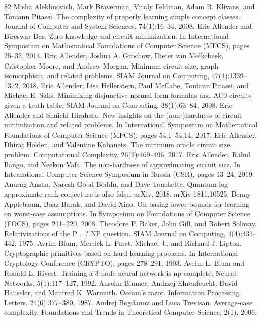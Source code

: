 \documentclass[10pt,a4paper]{article}
\begin{document}
\begin{thebibliography}{82}
Misha Alekhnovich, Mark Braverman, Vitaly Feldman, Adam R. Klivans, and Toniann Pitassi. The complexity of properly learning simple concept classes. Journal of Computer and System Sciences, 74(1):16–34, 2008.
Eric Allender and Bireswar Das. Zero knowledge and circuit minimization. In International Symposium on Mathematical Foundations of Computer Science (MFCS), pages 25–32, 2014.
Eric Allender, Joshua A. Grochow, Dieter van Melkebeek, Cristopher Moore, and Andrew Morgan. Minimum circuit size, graph isomorphism, and related problems. SIAM Journal on Computing, 47(4):1339–1372, 2018.
Eric Allender, Lisa Hellerstein, Paul McCabe, Toniann Pitassi, and Michael E. Saks. Minimizing disjunctive normal form formulas and AC0 circuits given a truth table. SIAM Journal on Computing, 38(1):63–84, 2008.
Eric Allender and Shuichi Hirahara. New insights on the (non-)hardness of circuit minimization and related problems. In International Symposium on Mathematical Foundations of Computer Science (MFCS), pages 54:1–54:14, 2017.
Eric Allender, Dhiraj Holden, and Valentine Kabanets. The minimum oracle circuit size problem. Computational Complexity, 26(2):469–496, 2017.
Eric Allender, Rahul Ilango, and Neekon Vafa. The non-hardness of approximating circuit size. In International Computer Science Symposium in Russia (CSR), pages 13–24, 2019.
Anurag Anshu, Naresh Goud Boddu, and Dave Touchette. Quantum log-approximate-rank conjecture is also false. arXiv, 2018. arXiv:1811.10525.
Benny Applebaum, Boaz Barak, and David Xiao. On basing lower-bounds for learning on worst-case assumptions. In Symposium on Foundations of Computer Science (FOCS), pages 211–220, 2008.
Theodore P. Baker, John Gill, and Robert Solovay. Relativizations of the P =? NP question. SIAM Journal on Computing, 4(4):431–442, 1975.
Avrim Blum, Merrick L. Furst, Michael J., and Richard J. Lipton. Cryptographic primitives based on hard learning problems. In International Cryptology Conference (CRYPTO), pages 278–291, 1993.
Avrim L. Blum and Ronald L. Rivest. Training a 3-node neural network is np-complete. Neural Networks, 5(1):117–127, 1992.
Anselm Blumer, Andrzej Ehrenfeucht, David Haussler, and Manfred K. Warmuth. Occam’s razor. Information Processing Letters, 24(6):377–380, 1987.
Andrej Bogdanov and Luca Trevisan. Average-case complexity. Foundations and Trends in Theoretical Computer Science, 2(1), 2006.

\end{thebibliography}
\end{document}
